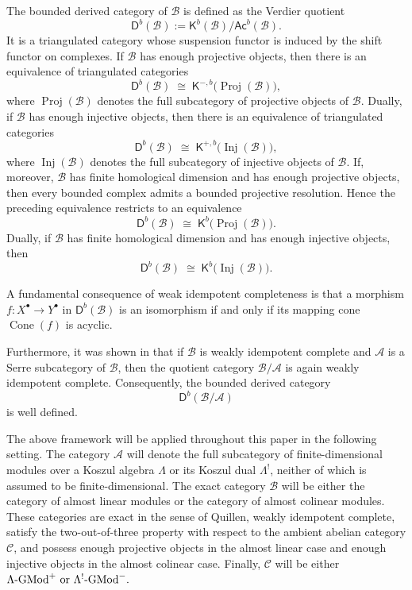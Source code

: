 \documentclass[11pt]{article}
\theoremstyle{definition}
\theoremstyle{remark}
\begin{document}
The bounded derived category of \(\mathcal{B}\) is defined as the Verdier quotient \[ \mathsf{D}^{b}(\mathcal{B}) := \mathsf{K}^{b}(\mathcal{B}) / \mathsf{Ac}^{b}(\mathcal{B}). \] It is a triangulated category whose suspension functor is induced by the shift functor on complexes. If \(\mathcal{B}\) has enough projective objects, then there is an equivalence of triangulated categories \[ \mathsf{D}^{b}(\mathcal{B}) \;\cong\; \mathsf{K}^{-,b}\bigl(\operatorname{Proj}(\mathcal{B})\bigr), \] where \(\operatorname{Proj}(\mathcal{B})\) denotes the full subcategory of projective objects of \(\mathcal{B}\). Dually, if \(\mathcal{B}\) has enough injective objects, then there is an equivalence of triangulated categories \[ \mathsf{D}^{b}(\mathcal{B}) \;\cong\; \mathsf{K}^{+,b}\bigl(\operatorname{Inj}(\mathcal{B})\bigr), \] where \(\operatorname{Inj}(\mathcal{B})\) denotes the full subcategory of injective objects of \(\mathcal{B}\). If, moreover, \(\mathcal{B}\) has finite homological dimension and has enough projective objects, then every bounded complex admits a bounded projective resolution. Hence the preceding equivalence restricts to an equivalence \[ \mathsf{D}^{b}(\mathcal{B}) \;\cong\; \mathsf{K}^{b}\bigl(\operatorname{Proj}(\mathcal{B})\bigr). \] Dually, if \(\mathcal{B}\) has finite homological dimension and has enough injective objects, then \[ \mathsf{D}^{b}(\mathcal{B}) \;\cong\; \mathsf{K}^{b}\bigl(\operatorname{Inj}(\mathcal{B})\bigr). \]




A fundamental consequence of weak idempotent completeness is that a morphism
\( 
f\colon X^\bullet \longrightarrow Y^\bullet
\)
in \(\mathsf{D}^{b}(\mathcal{B})\) is an isomorphism if and only if its mapping cone
\(\operatorname{Cone}(f)\)
is acyclic.

Furthermore, it was shown in \cite[Proposition~2.17]{9} that if \(\mathcal{B}\) is weakly idempotent complete and \(\mathcal{A}\) is a Serre subcategory of \(\mathcal{B}\), then the quotient category
\(\mathcal{B}/\mathcal{A}\)
is again weakly idempotent complete. Consequently, the bounded derived category
\[
\mathsf{D}^{b}(\mathcal{B}/\mathcal{A})
\]
is well defined.

The above framework will be applied throughout this paper in the following setting. The category \(\mathcal{A}\) will denote the full subcategory of finite-dimensional modules over a Koszul algebra \(\Lambda\) or its Koszul dual \(\Lambda^{!}\), neither of which is assumed to be finite-dimensional. The exact category \(\mathcal{B}\) will be either the category of almost linear modules or the category of almost colinear modules. These categories are exact in the sense of Quillen, weakly idempotent complete, satisfy the two-out-of-three property with respect to the ambient abelian category \(\mathcal{C}\), and possess enough projective objects in the almost linear case and enough injective objects in the almost colinear case. Finally, \(\mathcal{C}\) will be either
\( 
\Lambda\textup{-GMod}^{+}
\,\,\text{or}\,\,
\Lambda^{!}\textup{-GMod}^{-}.
\)
\end{document}
